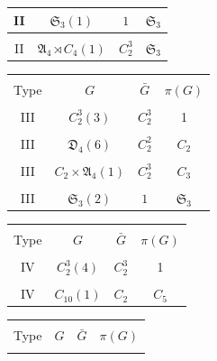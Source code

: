\documentclass[12pt,reqno]{amsart}
\theoremstyle{plain}
\theoremstyle{remark}
\theoremstyle{definition}
\numberwithin{equation}{section}
\def\fA{{\mathfrak A}}
\def\fD{{\mathfrak D}}
\def\fS{{\mathfrak S}}
\def\fS{{\mathfrak S}}
\begin{document}
\begin{table}[H]
\begin{minipage}[t]{0.48\textwidth}
\begin{tabular}{|c|c|c|c|}
II&$\fS_3(1)$&$1$&$\fS_3$\\\hline&&&\\[-0.4cm]

II&$\fA_4\rtimes C_4(1)$&$C_2^3$&$\fS_3$\\\hline
\end{tabular}
\end{minipage}

\vspace{0.45cm}

\begin{minipage}[t]{0.48\textwidth}
\centering
\begin{tabular}{|c|c|c|c|}
\hline&&&\\[-0.4cm]
Type& $G$ & $\bar G$&$\pi(G)$\\
\hline &&&\\[-0.4cm]

III&$C_2^3(3)$&$C_2^3$&1\\\hline&&&\\[-0.4cm]

III&$\fD_4(6)$&$C_2^2$&$C_2$\\\hline&&&\\[-0.4cm]

III&$C_2\times \fA_4(1)$&$C_2^3$&$C_3$\\\hline&&&\\[-0.4cm]

III&$\fS_3(2)$&$1$&$\fS_3$\\\hline
\end{tabular}
\end{minipage}
\hfill
\begin{minipage}[t]{0.48\textwidth}
\centering
\begin{tabular}{|c|c|c|c|}
\hline&&&\\[-0.4cm]
Type& $G$ & $\bar G$&$\pi(G)$\\
\hline &&&\\[-0.4cm]

IV&$C_2^3(4)$&$C_2^3$&1\\\hline&&&\\[-0.4cm]

IV&$C_{10}(1)$&$C_2$&$C_5$\\\hline
\end{tabular}
\end{minipage}

\vspace{0.45cm}

\begin{minipage}[t]{0.48\textwidth}
\centering
\begin{tabular}{|c|c|c|c|}
\hline&&&\\[-0.4cm]
Type& $G$ & $\bar G$&$\pi(G)$\\
\hline &&&\\[-0.4cm]


\end{tabular}
\end{minipage}
\end{table}
\end{document}
